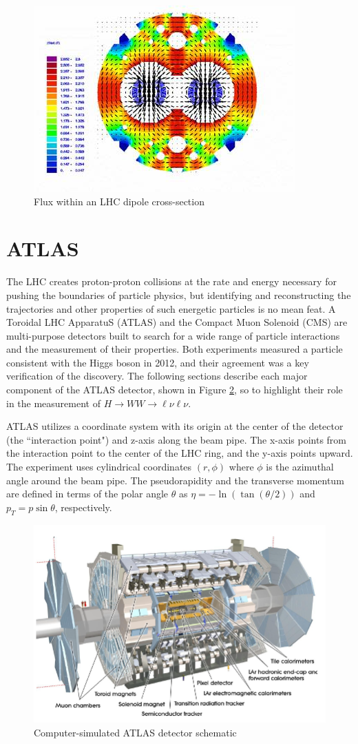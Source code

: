 \begin{figure}[!h]
        \centering
    \includegraphics[width=.6\textwidth]{Pictures/dipolemagnet.jpg}
    \caption{ Flux within an LHC dipole cross-section \cite{LHCref}}
    \label{fig:dipolemagnet}
\end{figure}

\section{ATLAS}
The LHC creates proton-proton collisions at the rate and energy necessary for pushing the boundaries of particle physics, but identifying and reconstructing the trajectories and other properties of such energetic particles is no mean feat. A Toroidal LHC ApparatuS (ATLAS) and the Compact Muon Solenoid (CMS) are multi-purpose detectors built to search for a wide range of particle interactions and the measurement of their properties. Both experiments measured a particle consistent with the Higgs boson in 2012, and their agreement was a key verification of the discovery. The following sections describe each major component of the ATLAS detector, shown in Figure \ref{fig:ATLASdet}, so to highlight their role in the measurement of $H\rightarrow WW \rightarrow \ell\nu\ell\nu$. 

ATLAS utilizes a coordinate system with its origin at the center of the detector (the ``interaction point") and z-axis along the beam pipe. The x-axis points from the interaction point to the center of the LHC ring, and the y-axis points upward. The experiment uses cylindrical coordinates $(r, \phi)$ where $\phi$ is the azimuthal angle around the beam pipe. The pseudorapidity and the transverse momentum are defined in terms of the polar angle $\theta$ as $\eta = -\ln( \tan(\theta/2))$ and $p_T = p\sin\theta$, respectively. 
\begin{figure}[!h]
    \centering
    \includegraphics[width=.7\textwidth]{Pictures/ATLASdetector.PNG}
    \caption{Computer-simulated ATLAS detector schematic \cite{detector}}
    \label{fig:ATLASdet}
\end{figure}

